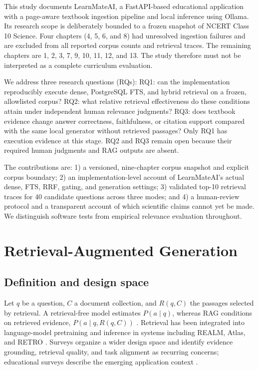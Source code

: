 \documentclass[conference]{IEEEtran}
\begin{document}
This study documents LearnMateAI, a FastAPI-based educational application with a page-aware textbook ingestion pipeline and local inference using Ollama. Its research scope is deliberately bounded to a frozen snapshot of NCERT Class 10 Science. Four chapters (4, 5, 6, and 8) had unresolved ingestion failures and are excluded from all reported corpus counts and retrieval traces. The remaining chapters are 1, 2, 3, 7, 9, 10, 11, 12, and 13. The study therefore must not be interpreted as a complete curriculum evaluation.

We address three research questions (RQs): RQ1: can the implementation reproducibly execute dense, PostgreSQL FTS, and hybrid retrieval on a frozen, allowlisted corpus? RQ2: what relative retrieval effectiveness do these conditions attain under independent human relevance judgments? RQ3: does textbook evidence change answer correctness, faithfulness, or citation support compared with the same local generator without retrieved passages? Only RQ1 has execution evidence at this stage. RQ2 and RQ3 remain open because their required human judgments and RAG outputs are absent.

The contributions are: 1) a versioned, nine-chapter corpus snapshot and explicit corpus boundary; 2) an implementation-level account of LearnMateAI's actual dense, FTS, RRF, gating, and generation settings; 3) validated top-10 retrieval traces for 40 candidate questions across three modes; and 4) a human-review protocol and a transparent account of which scientific claims cannot yet be made. We distinguish software tests from empirical relevance evaluation throughout.

\section{Retrieval-Augmented Generation}
\subsection{Definition and design space}
Let $q$ be a question, $C$ a document collection, and $R(q,C)$ the passages selected by retrieval. A retrieval-free model estimates $P(a\mid q)$, whereas RAG conditions on retrieved evidence, $P(a\mid q,R(q,C))$ \cite{r1}. Retrieval has been integrated into language-model pretraining and inference in systems including REALM, Atlas, and RETRO \cite{r13,r14,r15}. Surveys organize a wider design space and identify evidence grounding, retrieval quality, and task alignment as recurring concerns; educational surveys describe the emerging application context \cite{r16,r17,r18,r19}.
\end{document}
